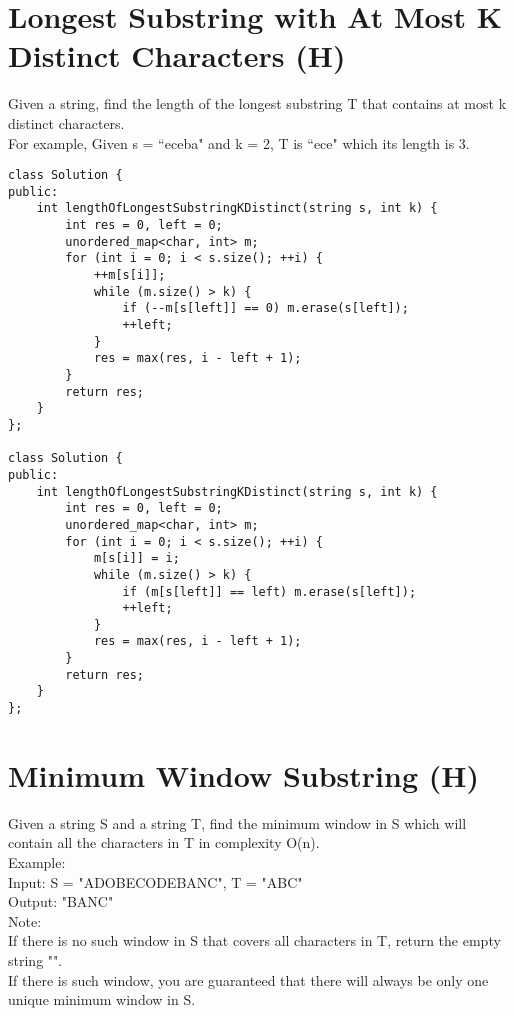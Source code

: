 \section{Longest Substring with At Most K Distinct Characters (H)}
Given a string, find the length of the longest substring T that contains at most k distinct characters.\\

For example, Given s = ``eceba" and k = 2, T is ``ece" which its length is 3.\\

\begin{lstlisting}
class Solution {
public:
    int lengthOfLongestSubstringKDistinct(string s, int k) {
        int res = 0, left = 0;
        unordered_map<char, int> m;
        for (int i = 0; i < s.size(); ++i) {
            ++m[s[i]];
            while (m.size() > k) {
                if (--m[s[left]] == 0) m.erase(s[left]);
                ++left;
            }
            res = max(res, i - left + 1);
        }
        return res;
    }
};

class Solution {
public:
    int lengthOfLongestSubstringKDistinct(string s, int k) {
        int res = 0, left = 0;
        unordered_map<char, int> m;
        for (int i = 0; i < s.size(); ++i) {
            m[s[i]] = i;
            while (m.size() > k) {
                if (m[s[left]] == left) m.erase(s[left]);
                ++left;
            }
            res = max(res, i - left + 1);
        }
        return res;
    }
};
\end{lstlisting}

\section{Minimum Window Substring (H)}
Given a string S and a string T, find the minimum window in S which will contain all the characters in T in complexity O(n).\\

Example:\\
Input: S = "ADOBECODEBANC", T = "ABC"\\
Output: "BANC"\\

Note:\\
    If there is no such window in S that covers all characters in T, return the empty string "".\\
    If there is such window, you are guaranteed that there will always be only one unique minimum window in S.\\

